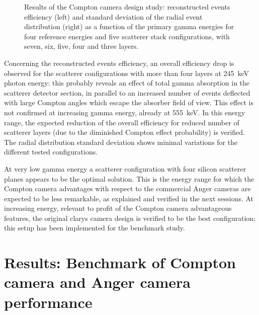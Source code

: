 \begin{figure}[h!]
\begin{subfigure}[t]{.5\textwidth}
 \label{chap5::fig::design_rms}
\end{subfigure}
\caption{Results of the Compton camera design study: reconstructed events efficiency (left) and standard deviation of the radial event distribution (right) as a function of the primary gamma energies for four reference energies and five scatterer stack configurations, with seven, six, five, four and three layers.}
\label{chap5::fig::design}
\end{figure} 

Concerning the reconstructed events efficiency, an overall efficiency drop is observed for the scatterer configurations with more than four layers at 245~keV photon energy: this probably reveals an effect of total gamma absorption in the scatterer detector section, in parallel to an increased number of events deflected with large Compton angles which escape the absorber field of view. This effect is not confirmed at increasing gamma energy, already at 555~keV. In this energy range, the expected reduction of the overall efficiency for reduced number of scatterer layers (due to the diminished Compton effect probability) is verified. The radial distribution standard deviation shows minimal variations for the different tested configurations.

At very low gamma energy a scatterer configuration with four silicon scatterer planes appears to be the optimal solution. This is the energy range for which the Compton camera advantages with respect to the commercial Anger cameras are expected to be less remarkable, as explained and verified in the next sessions. At increasing energy, relevant to profit of the Compton camera advantageous features, the original \gls{clarys} camera design is verified to be the best configuration; this setup has been implemented for the benchmark study.   


\section{Results: Benchmark of Compton camera and Anger camera performance}\label{chap5::sec::Results_benchmark}

